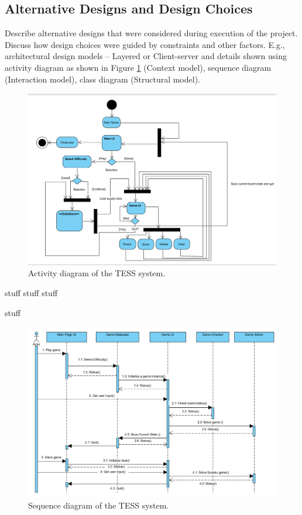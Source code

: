 \documentclass{article}
\begin{document}
\subsection{Alternative Designs and Design Choices}
Describe alternative designs that were considered during execution of the project. Discuss how design choices were guided by constraints and other factors. E.g., architectural design models – Layered or Client-server and details shown using activity diagram as shown in Figure \ref{fig:activitydiagram} (Context model), sequence diagram (Interaction model), class diagram (Structural model).

\begin{figure}[h!]
	\centering
	\includegraphics[width=5.0in]{./Figure/Activity_Diagram.PNG}
	\caption{Activity diagram of the TESS system.}\label{fig:activitydiagram}
\end{figure}

stuff \newline
stuff \newline
stuff \newline

stuff \newline
\begin{figure}[h!]
	\centering
	\includegraphics[width=5.0in]{./Figure/Sequence_Diagram.PNG}
	\caption{Sequence diagram of the TESS system.\cite{UMLDoc}}
	\label{fig:sequencediagram}
\end{figure}
\end{document}
